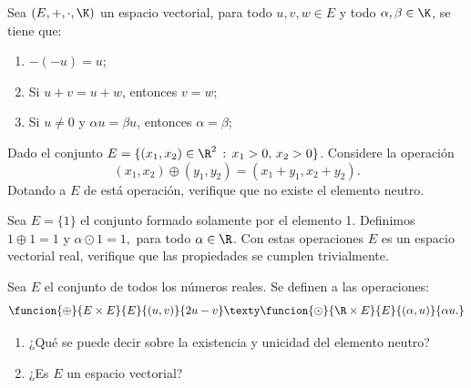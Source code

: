 \documentclass[compacto,10pt]{pubciencias-notas}
\begin{document}
\begin{prop}
Sea $(E,+,\cdot,\K)$ un espacio vectorial, para todo $u, v, w \in E$ y todo $\alpha, \beta \in \K$, se tiene que:
    \begin{enumerate}
        \item $-(-u) = u$;
        \item Si $u + v = u + w$, entonces $v = w$;
        \item Si $u \neq 0$ y $\alpha u = \beta u$, entonces $\alpha  = \beta$;
    \end{enumerate}
\end{prop}

\begin{ejer}\hspace{0pt} Dado el conjunto $E = \{(x_{1},x_{2})\in\R^{2}\,:\,x_{1}>0,\,x_{2}>0\}$. Considere la operación
\[
    (x_{1},x_{2}) \oplus (y_{1},y_{2}) = (x_{1}+y_{1},x_{2}+y_{2}).
\]
Dotando a $E$ de está operación, verifique que no existe el elemento neutro.
\end{ejer}

\begin{ejem}\hspace{0pt} Sea $E=\{1\}$ el conjunto formado solamente por el elemento 1. Definimos $1 \oplus 1 = 1$ y $\alpha \odot 1 = 1,$ para todo $\alpha\in\R$. Con estas operaciones $E$ es un espacio vectorial real, verifique que las propiedades se cumplen trivialmente.
\end{ejem}


\begin{ejer}\hspace{0pt} Sea $E$ el conjunto de todos los números reales. Se definen a las operaciones:
\[
    \funcion{\oplus}{E \times E}{E}{(u, v)}{2u - v}
    \texty
    \funcion{\odot}{\R \times E}{E}{(\alpha, u)}{\alpha u.}
\]
\begin{enumerate}
\item ¿Qué se puede decir sobre la existencia y unicidad del elemento neutro?
\item ¿Es $E$ un espacio vectorial?
\end{enumerate}
\end{ejer}

\end{document}
